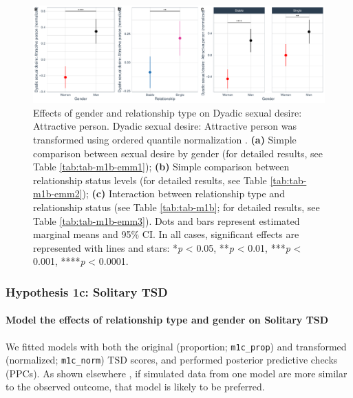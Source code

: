 \documentclass[
  bookmarksnumbered]{article}
\begin{document}
\begin{figure}
\centering
\includegraphics{Sexual_Desire_Arousal_V2_files/figure-latex/fig-h1b-1.pdf}
\caption{\label{fig:fig-h1b}Effects of gender and relationship type on Dyadic sexual desire: Attractive person. Dyadic sexual desire: Attractive person was transformed using ordered quantile normalization \autocite{petersonOrderedQuantileNormalization2020a}. \textbf{(a)} Simple comparison between sexual desire by gender (for detailed results, see Table \ref{tab:tab-m1b-emm1}); \textbf{(b)} Simple comparison between relationship status levels (for detailed results, see Table \ref{tab:tab-m1b-emm2}); \textbf{(c)} Interaction between relationship type and relationship status (see Table \ref{tab:tab-m1b}; for detailed results, see Table \ref{tab:tab-m1b-emm3}). Dots and bars represent estimated marginal means and 95\% CI. In all cases, significant effects are represented with lines and stars: *\emph{p} \textless{} 0.05, **\emph{p} \textless{} 0.01, ***\emph{p} \textless{} 0.001, ****\emph{p} \textless{} 0.0001.}
\end{figure}

\subsubsection{Hypothesis 1c: Solitary TSD}\label{hypothesis1c}

\paragraph{Model the effects of relationship type and gender on Solitary TSD}\label{model-the-effects-of-relationship-type-and-gender-on-solitary-tsd-2}

We fitted models with both the original (proportion; \texttt{m1c\_prop}) and transformed (normalized; \texttt{m1c\_norm}) TSD scores, and performed posterior predictive checks (PPCs). As shown elsewhere \autocite[e.g.,][]{gabryVisualizationBayesianWorkflow2019}, if simulated data from one model are more similar to the observed outcome, that model is likely to be preferred.
\end{document}
